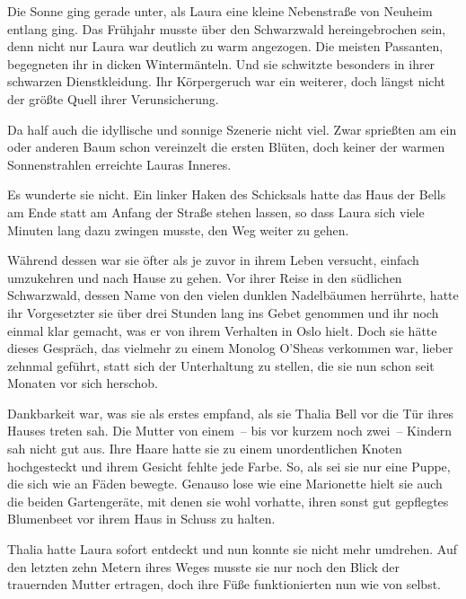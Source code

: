 Die Sonne ging gerade unter, als Laura eine kleine Nebenstraße von Neuheim entlang ging. Das Frühjahr musste über den Schwarzwald hereingebrochen sein, denn nicht nur Laura war deutlich zu warm angezogen. Die meisten Passanten, begegneten ihr in dicken Wintermänteln. Und sie schwitzte besonders in ihrer schwarzen Dienstkleidung. Ihr Körpergeruch war ein weiterer, doch längst nicht der größte Quell ihrer Verunsicherung.

\par

Da half auch die idyllische und sonnige Szenerie nicht viel. Zwar sprießten am ein oder anderen Baum schon vereinzelt die ersten Blüten, doch keiner der warmen Sonnenstrahlen erreichte Lauras Inneres.

\par

Es wunderte sie nicht. Ein linker Haken des Schicksals hatte das Haus der Bells am Ende statt am Anfang der Straße stehen lassen, so dass Laura sich viele Minuten lang dazu zwingen musste, den Weg weiter zu gehen.

\par

Während dessen war sie öfter als je zuvor in ihrem Leben versucht, einfach umzukehren und nach Hause zu gehen. Vor ihrer Reise in den südlichen Schwarzwald, dessen Name von den vielen dunklen Nadelbäumen herrührte, hatte ihr Vorgesetzter sie über drei Stunden lang ins Gebet genommen und ihr noch einmal klar gemacht, was er von ihrem Verhalten in Oslo hielt. Doch sie hätte dieses Gespräch, das vielmehr zu einem Monolog O'Sheas verkommen war, lieber zehnmal geführt, statt sich der Unterhaltung zu stellen, die sie nun schon seit Monaten vor sich herschob.

\par

Dankbarkeit war, was sie als erstes empfand, als sie Thalia Bell vor die Tür ihres Hauses treten sah. Die Mutter von einem~-- bis vor kurzem noch zwei~-- Kindern sah nicht gut aus. Ihre Haare hatte sie zu einem unordentlichen Knoten hochgesteckt und ihrem Gesicht fehlte jede Farbe. So, als sei sie nur eine Puppe, die sich wie an Fäden bewegte. Genauso lose wie eine Marionette hielt sie auch die beiden Gartengeräte, mit denen sie wohl vorhatte, ihren sonst gut gepflegtes Blumenbeet vor ihrem Haus in Schuss zu halten.

\par

Thalia hatte Laura sofort entdeckt und nun konnte sie nicht mehr umdrehen. Auf den letzten zehn Metern ihres Weges musste sie nur noch den Blick der trauernden Mutter ertragen, doch ihre Füße funktionierten nun wie von selbst.


